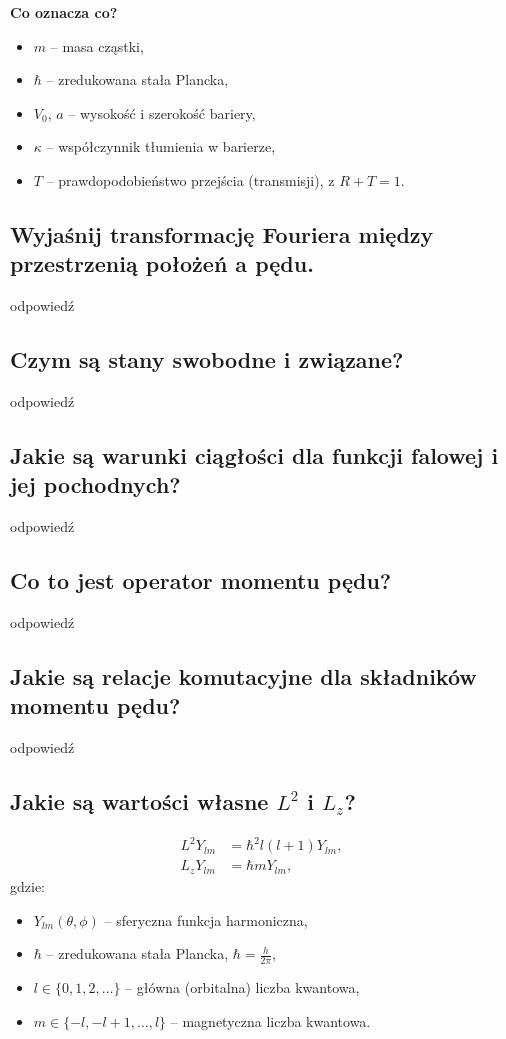 		\vspace{4pt}
		\textbf{Co oznacza co?}
		\begin{itemize}
			\item $m$ – masa cząstki,
			\item $\hbar$ – zredukowana stała Plancka,
			\item $V_0$, $a$ – wysokość i szerokość bariery,
			\item $\kappa$ – współczynnik tłumienia w barierze,
			\item $T$ – prawdopodobieństwo przejścia (transmisji), z $R+T=1$.
		\end{itemize}

\subsection{Wyjaśnij transformację Fouriera między przestrzenią położeń a pędu.}

odpowiedź

\subsection{Czym są stany swobodne i związane?}

odpowiedź

\subsection{Jakie są warunki ciągłości dla funkcji falowej i jej pochodnych?}

odpowiedź

\subsection{Co to jest operator momentu pędu?}

odpowiedź

\subsection{Jakie są relacje komutacyjne dla składników momentu pędu?}

odpowiedź

\subsection{Jakie są wartości własne $L^2$ i $L_z$?}

\begin{align*}
L^2 Y_{lm} &= \hbar^2 l(l+1) Y_{lm}, \\
L_z Y_{lm} &= \hbar m Y_{lm},
\end{align*}
gdzie:
\begin{itemize}
  \item \( Y_{lm}(\theta, \phi) \) -- sferyczna funkcja harmoniczna,
  \item \( \hbar \) -- zredukowana stała Plancka, \( \hbar = \frac{h}{2\pi} \),
  \item \( l \in \{0, 1, 2, \ldots\} \) -- główna (orbitalna) liczba kwantowa,
  \item \( m \in \{-l, -l+1, \ldots, l\} \) -- magnetyczna liczba kwantowa.
\end{itemize}

